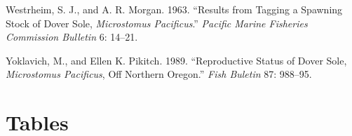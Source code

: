 \documentclass[11pt,
  english,
  a4paper,
]{article}
\begin{document}
\begin{cslreferences}
\leavevmode\hypertarget{ref-westrheim_results_1963}{}%
Westrheim, S. J., and A. R. Morgan. 1963. ``Results from Tagging a Spawning Stock of Dover Sole, \emph{Microstomus Pacificus}.'' \emph{Pacific Marine Fisheries Commission Bulletin} 6: 14--21.

\leavevmode\hypertarget{ref-yoklavich_reproductive_1989}{}%
Yoklavich, M., and Ellen K. Pikitch. 1989. ``Reproductive Status of Dover Sole, \emph{Microstomus Pacificus}, Off Northern Oregon.'' \emph{Fish Buletin} 87: 988--95.
\end{cslreferences}

\leavevmode\tagmcend\tagstructend

\clearpage


\hypertarget{tables}{%
\section{Tables}\label{tables}}

\leavevmode\tagmcend\tagstructend



\newpage

\begingroup\fontsize{10}{12}\selectfont
\begingroup\fontsize{10}{12}\selectfont
\end{document}
